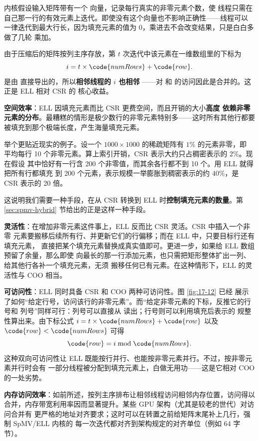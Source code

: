内核假设输入矩阵带有一个  向量，记录每行真实的非零元素个数，使
线程只需在自己那一行的有效元素上迭代。即使没有这个向量也不影响正确性——线程可以
一律迭代到最大行长，因为填充元素的值为 0，乘进去不会改变结果，只是白白多做了几轮
乘加。

由于压缩后的矩阵按列主序存放，第 $t$ 次迭代中该元素在一维数组里的下标为
\[
  i = t\times\code{numRows} + \code{row}.
\]
 是由  直接导出的，所以\textbf{相邻线程的 $i$ 也相邻}
——对  和  的访问因此是合并的。这正是 ELL 相对 CSR 的
核心收益。

\textbf{空间效率}：ELL 因填充元素而比 CSR 更费空间，而且开销的大小\textbf{高度
依赖非零元素的分布}。最糟糕的情形是极少数行的非零元素特别多——这时所有其他行都要
被填充到那个极端长度，产生海量填充元素。

举个更贴近现实的例子。设一个 $1000\times1000$ 的稀疏矩阵有 $1\%$ 的元素非零，即
平均每行 10 个非零元素。算上索引开销，CSR 表示大约只占稠密表示的 $2\%$。现在假设
其中恰好有一行含 200 个非零值，而其余各行都不到 10 个。用 ELL 就得把所有行都填充
到 200 个元素，表示规模一举膨胀到稠密表示的约 $40\%$，是 CSR 表示的 20 倍。

这说明我们需要一种手段，在从 CSR 转换到 ELL 时\textbf{控制填充元素的数量}。第
\ref{sec:spmv-hybrid} 节给出的正是这样一种手段。

\textbf{灵活性}：在增加非零元素这件事上，ELL 反而比 CSR 灵活。CSR 中插入一个非零
元素要搬移后续所有行、并更新它们的行偏移；而在 ELL 中，只要目标行还有填充元素，
直接把某个填充元素替换成真实值即可。更进一步，如果给 ELL 数组预留了余量，那么即使
向最长的那一行添加元素，也只需把矩形整体扩出一列、给其他行各补一个填充元素，无须
搬移任何已有元素。在这种情形下，ELL 的灵活性与 COO 相当。

\textbf{可访问性}：ELL 同时具备 CSR 和 COO 两种可访问性。图 \ref{fig:17-12} 已经
展示了如何“给定行号，访问该行的非零元素”。而“给定非零元素的下标，反推它的行号和
列号”同样可行：列号可以直接从  读出；行号则可以利用填充后表示的
规整性算出来。由下标公式 $i = t\times\code{numRows} + \code{row}$ 以及
$\code{row} < \code{numRows}$ 可得
\[
  \code{row} = i \bmod \code{numRows}.
\]
这种双向可访问性让 ELL 既能按行并行、也能按非零元素并行。不过，按非零元素并行时会有
一部分线程被分配到填充元素上，白做无用功——这是它相对 COO 的一处劣势。

\textbf{内存访问效率}：如前所述，按列主序排布让相邻线程访问相邻内存位置，访问得以
合并，内存带宽利用率因而显著提升。某些 GPU 架构（尤其是较老的世代）对访问合并有
更严格的地址对齐要求；这时可以在转置之前给矩阵末尾补上几行，强制 SpMV/ELL 内核的
每一次迭代都对齐到架构规定的对齐单位（例如 64 字节）。

